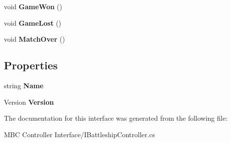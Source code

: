 \begin{DoxyCompactItemize}
\item 
\hypertarget{interface_m_b_c_1_1_core_1_1_i_battleship_controller_add0a1ee69c8b1ee623635a6886263841}{void {\bfseries Game\-Won} ()}\label{interface_m_b_c_1_1_core_1_1_i_battleship_controller_add0a1ee69c8b1ee623635a6886263841}

\item 
\hypertarget{interface_m_b_c_1_1_core_1_1_i_battleship_controller_a0d0534e190e468cdfb1d7a333dc025d7}{void {\bfseries Game\-Lost} ()}\label{interface_m_b_c_1_1_core_1_1_i_battleship_controller_a0d0534e190e468cdfb1d7a333dc025d7}

\item 
\hypertarget{interface_m_b_c_1_1_core_1_1_i_battleship_controller_a35963db7e91bf53b2f9152898659e098}{void {\bfseries Match\-Over} ()}\label{interface_m_b_c_1_1_core_1_1_i_battleship_controller_a35963db7e91bf53b2f9152898659e098}

\end{DoxyCompactItemize}
\subsection*{Properties}
\begin{DoxyCompactItemize}
\item 
\hypertarget{interface_m_b_c_1_1_core_1_1_i_battleship_controller_a6a6130592110828d325bc93e1d55586d}{string {\bfseries Name}}\label{interface_m_b_c_1_1_core_1_1_i_battleship_controller_a6a6130592110828d325bc93e1d55586d}

\item 
\hypertarget{interface_m_b_c_1_1_core_1_1_i_battleship_controller_a526e01cd2a35e521f0965b3fbb1b4cd4}{Version {\bfseries Version}}\label{interface_m_b_c_1_1_core_1_1_i_battleship_controller_a526e01cd2a35e521f0965b3fbb1b4cd4}

\end{DoxyCompactItemize}


The documentation for this interface was generated from the following file\-:\begin{DoxyCompactItemize}
\item 
M\-B\-C Controller Interface/I\-Battleship\-Controller.\-cs\end{DoxyCompactItemize}
